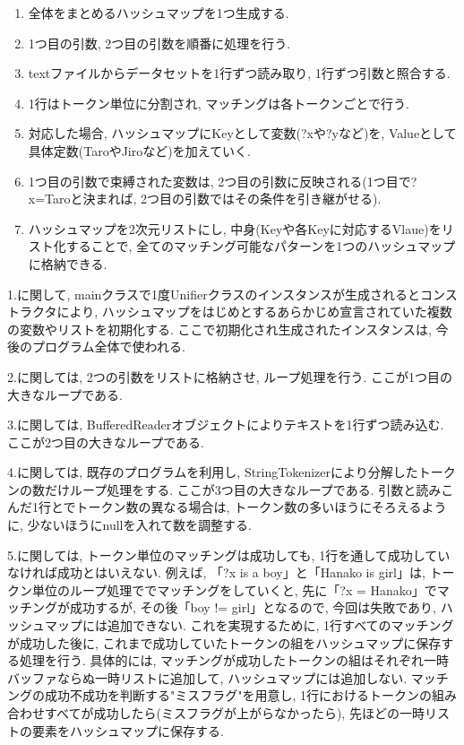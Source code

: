 \documentclass[uplatex,12pt]{jsarticle}
\begin{document}
\begin{enumerate}
\item 全体をまとめるハッシュマップを1つ生成する.
\item 1つ目の引数, 2つ目の引数を順番に処理を行う.
\item textファイルからデータセットを1行ずつ読み取り, 1行ずつ引数と照合する.
\item 1行はトークン単位に分割され, マッチングは各トークンごとで行う.
\item 対応した場合, ハッシュマップにKeyとして変数(?xや?yなど)を, Valueとして具体定数(TaroやJiroなど)を加えていく.
\item 1つ目の引数で束縛された変数は, 2つ目の引数に反映される(1つ目で?x=Taroと決まれば, 2つ目の引数ではその条件を引き継がせる).
\item ハッシュマップを2次元リストにし, 中身(Keyや各Keyに対応するVlaue)をリスト化することで, 全てのマッチング可能なパターンを1つのハッシュマップに格納できる.
\end{enumerate}

1.に関して, mainクラスで1度Unifierクラスのインスタンスが生成されるとコンストラクタにより, ハッシュマップをはじめとするあらかじめ宣言されていた複数の変数やリストを初期化する. ここで初期化され生成されたインスタンスは, 今後のプログラム全体で使われる.

2.に関しては, 2つの引数をリストに格納させ, ループ処理を行う. ここが1つ目の大きなループである.

3.に関しては, BufferedReaderオブジェクトによりテキストを1行ずつ読み込む. ここが2つ目の大きなループである.

4.に関しては, 既存のプログラムを利用し, StringTokenizerにより分解したトークンの数だけループ処理をする. ここが3つ目の大きなループである. 引数と読みこんだ1行とでトークン数の異なる場合は, トークン数の多いほうにそろえるように, 少ないほうにnullを入れて数を調整する.

5.に関しては, トークン単位のマッチングは成功しても, 1行を通して成功していなければ成功とはいえない. 例えば, 「?x is a boy」と「Hanako is girl」は, トークン単位のループ処理ででマッチングをしていくと, 先に「?x = Hanako」でマッチングが成功するが, その後「boy != girl」となるので, 今回は失敗であり, ハッシュマップには追加できない. これを実現するために, 1行すべてのマッチングが成功した後に, これまで成功していたトークンの組をハッシュマップに保存する処理を行う. 具体的には, マッチングが成功したトークンの組はそれぞれ一時バッファならぬ一時リストに追加して, ハッシュマップには追加しない. マッチングの成功不成功を判断する"ミスフラグ"を用意し, 1行におけるトークンの組み合わせすべてが成功したら(ミスフラグが上がらなかったら), 先ほどの一時リストの要素をハッシュマップに保存する.
\end{document}
